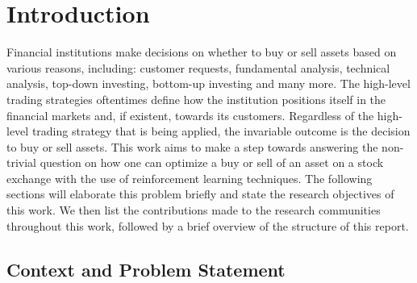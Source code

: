 \chapter{Introduction}

Financial institutions make decisions on whether to buy or sell assets based on various reasons, including: customer requests, fundamental analysis\cite{fundamental-analysis}, technical analysis\cite{technical-analysis}, top-down investing\cite{td-investing}, bottom-up investing\cite{bu-investing} and many more.
The high-level trading strategies oftentimes define how the institution positions itself in the financial markets and, if existent, towards its customers.
Regardless of the high-level trading strategy that is being applied, the invariable outcome is the decision to buy or sell assets.
This work aims to make a step towards answering the non-trivial question on how one can optimize a buy or sell of an asset on a stock exchange with the use of reinforcement learning techniques.
The following sections will elaborate this problem briefly and state the research objectives of this work.
We then list the contributions made to the research communities throughout this work, followed by a brief overview of the structure of this report.

\section{Context and Problem Statement}
\label{sec:problem-statement}

